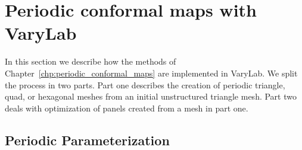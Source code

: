 \documentclass[Thesis.tex]{subfiles}
\begin{document}
\section{Periodic conformal maps with {\sc VaryLab}}
In this section we describe how the methods of Chapter~\ref{chp:periodic_conformal_maps} are implemented in {\sc VaryLab}. We split the process in two parts. Part one describes the creation of periodic triangle, quad, or hexagonal meshes from an initial unstructured triangle mesh. Part two deals with optimization of panels created from a mesh in part one.

\subsection{Periodic Parameterization}

\end{document}
